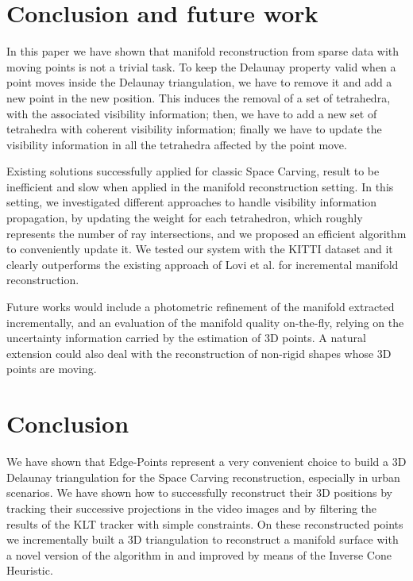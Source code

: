 \section{Conclusion and future work}
\label{sec:conclusion}
In this paper we have shown that manifold reconstruction from sparse data with moving points is not a trivial task. To keep the Delaunay property valid when a point moves inside the Delaunay triangulation, we have to remove it and add a new point in the new position. This induces the removal of a set of tetrahedra, with the associated visibility information; then, we have to add a new set of tetrahedra with coherent visibility information; finally we have to update the visibility information in all the tetrahedra affected by the point move.

Existing solutions successfully applied for classic Space Carving, result to be inefficient and slow when applied in the manifold reconstruction setting. 
In this setting, we investigated different approaches to handle visibility information propagation, by updating the weight for each tetrahedron, which roughly represents  the number of ray intersections, and we proposed an efficient algorithm to conveniently update it. 
We tested our system with the KITTI dataset and it clearly outperforms the existing approach of Lovi et al. \cite{Lovi_et_al_11} for incremental manifold reconstruction.

Future works would include a photometric refinement of the manifold extracted incrementally, and an evaluation of the manifold quality on-the-fly, relying on the uncertainty information carried by the estimation of 3D points. 
A natural extension could also deal with the reconstruction of non-rigid shapes whose 3D points are moving.




\section{Conclusion}
\label{sec:conclusion}
We have shown that Edge-Points represent a very convenient choice to build a 3D Delaunay triangulation for the Space Carving reconstruction, especially in urban scenarios.
We have shown how to successfully reconstruct their 3D positions by tracking their successive projections in the video images and by filtering the results of the KLT tracker with simple constraints. On these reconstructed points we incrementally built a 3D triangulation to reconstruct a manifold surface with a novel version of the algorithm in \cite{litvinov_lhuillier_13} and \cite{litvinov_Lhiuller14} improved by means of the Inverse Cone Heuristic.

